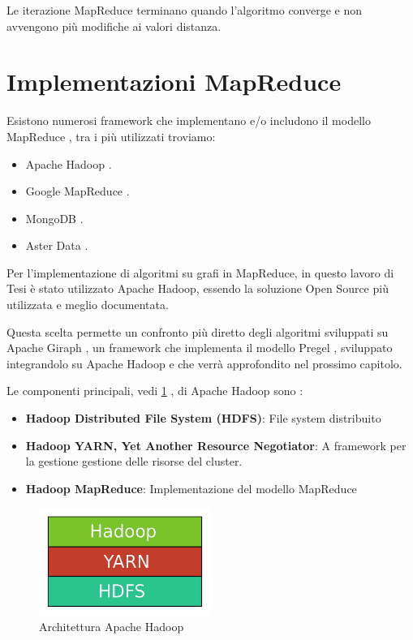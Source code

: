 \documentclass[LaM,binding=0.6cm]{sapthesis}
\begin{document}
Le iterazione MapReduce terminano quando l'algoritmo converge e non avvengono più modifiche ai valori distanza.

\section{Implementazioni MapReduce}


Esistono numerosi framework che implementano e/o includono il modello MapReduce \cite{Dean:2008:MSD:1327452.1327492}, tra i più utilizzati troviamo: 
\begin{itemize}
\item Apache Hadoop \cite{1_hadoop.apache.org_2015}.
\item Google MapReduce \cite{Dean:2008:MSD:1327452.1327492}.
\item MongoDB \cite{2_mongodb.org_2015}.
\item Aster Data \cite{3_it.teradata.com_2015}.
\end{itemize}


Per l'implementazione di algoritmi su grafi in MapReduce, in questo lavoro di Tesi è stato utilizzato Apache Hadoop, essendo la soluzione Open Source più utilizzata e meglio documentata.

Questa scelta permette un confronto più diretto degli algoritmi sviluppati su Apache Giraph \cite{4_giraph.apache.org_2015} , un framework che implementa il modello Pregel \cite{Malewicz:2010:PSL:1807167.1807184}, sviluppato integrandolo su Apache Hadoop e che verrà approfondito nel prossimo capitolo.

Le componenti principali, vedi \ref{fig:layer_hadoop} , di Apache Hadoop sono :
\begin{itemize}
\item \textbf{Hadoop Distributed File System (HDFS)}: File system distribuito
\item \textbf{Hadoop YARN,  Yet Another Resource Negotiator}: A framework per la gestione gestione delle risorse del cluster.
\item \textbf{Hadoop MapReduce}:  Implementazione del modello MapReduce
\end{itemize}

\begin{figure}
\centering
\includegraphics[width=0.5\textwidth]{layer_hadoop}
\caption{Architettura Apache Hadoop}
\label{fig:layer_hadoop}
\end{figure}
\end{document}
